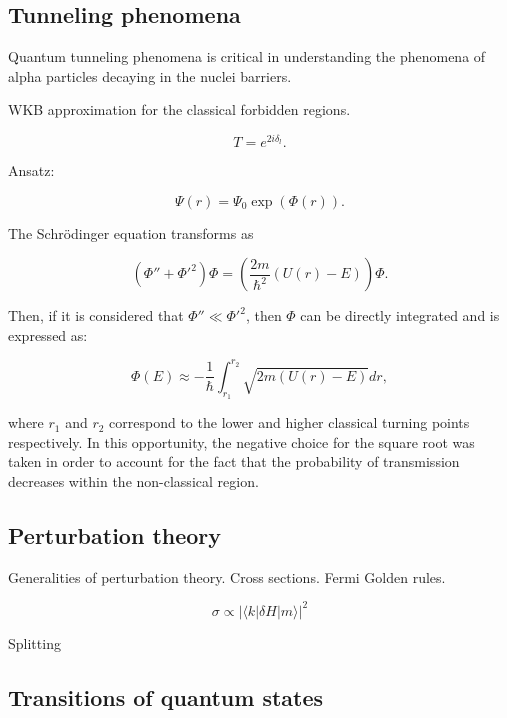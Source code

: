 \documentclass[openany]{book}
\begin{document}
\subsection{Tunneling phenomena}

Quantum tunneling phenomena is critical in understanding the phenomena of alpha particles decaying in the nuclei barriers. 

WKB approximation for the classical forbidden regions.

\begin{equation}
	T = e^{2i\delta_l}.
\end{equation}


Ansatz: 

\begin{equation}
	\Psi(r) = \Psi_0\exp{(\Phi(r))}.
\end{equation}

The Schrödinger equation transforms as 

\begin{equation}
	\left(\Phi'' + \Phi'^{2} \right)\Phi = \left(\frac{2m}{\hbar^2} (U(r) - E)\right) \Phi.
\end{equation}

Then, if it is considered that $\Phi'' \ll \Phi'^{2}$, then $\Phi$ can be directly integrated and is expressed as:

\begin{equation}
	\Phi(E) \approx -\frac{1}{\hbar}\int_{r_1}^{r_2} {\sqrt{2m(U(r)-E)}} dr,
\end{equation}

where $r_1$ and $r_2$ correspond to the lower and higher classical turning points respectively. In this opportunity, the negative choice for the square root was taken in order to account for the fact that the probability of transmission decreases within the non-classical region.


\subsection{Perturbation theory}
Generalities of perturbation theory. Cross sections.  Fermi Golden rules.

\begin{equation}
	\sigma \propto |\langle k | \delta H|m \rangle|^2
\end{equation}

Splitting 



\subsection{Transitions of quantum states}
\end{document}
